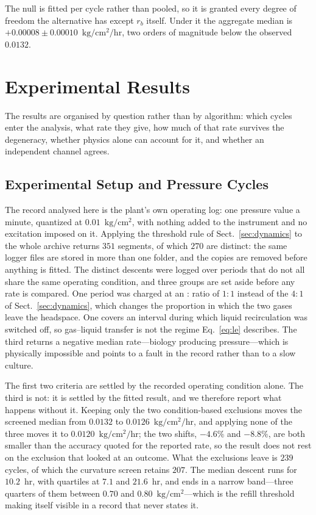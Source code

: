 \documentclass[runningheads]{llncs}
\newcommand{\pu}{\ensuremath{\mathrm{kg/cm^{2}}}}
\newcommand{\ratu}{\ensuremath{\mathrm{kg/cm^{2}/hr}}}
\newcommand{\rb}{\ensuremath{r_{b}}}
\begin{document}
The null is fitted per cycle rather than pooled, so it is granted every
degree of freedom the alternative has except $\rb$ itself. Under it the
aggregate median is
$+0.00008 \pm 0.00010$~\ratu{}, two orders of magnitude below the
observed $0.0132$.

\section{Experimental Results}
\label{sec:results}

The results are organised by question rather than by algorithm: which
cycles enter the analysis, what rate they give, how much of that rate
survives the degeneracy, whether physics alone can account for it, and
whether an independent channel agrees.

\subsection{Experimental Setup and Pressure Cycles}
\label{sec:setup}

The record analysed here is the plant's own operating log: one pressure
value a minute, quantized at $0.01$~\pu{}, with nothing added to the
instrument and no excitation imposed on it. Applying the threshold rule
of Sect.~\ref{sec:dynamics} to the whole archive returns $351$ segments, of which $270$ are
distinct: the same logger files are stored in more than one folder,
and the copies are removed before anything is fitted. The distinct
descents were logged over periods that do not all share the same operating
condition, and three groups are set aside before any rate is compared.
One period was charged at an : ratio of $1{:}1$ instead
of the $4{:}1$ of Sect.~\ref{sec:dynamics}, which changes the
proportion in which the two gases leave the headspace. One covers an
interval during which liquid recirculation was switched off, so
gas--liquid transfer is not the regime Eq.~\eqref{eq:le} describes.
The third returns a negative median rate---biology producing
pressure---which is physically impossible and points to a fault in the
record rather than to a slow culture.

The first two criteria are settled by the recorded operating condition
alone. The third is not: it is settled by the fitted result, and we
therefore report what happens without it. Keeping only the two
condition-based exclusions moves the screened median from $0.0132$ to
$0.0126$~\ratu{}, and applying none of the three moves it to
$0.0120$~\ratu{}; the two shifts, $-4.6\%$ and $-8.8\%$, are both
smaller than the accuracy quoted for the reported rate, so the result
does not rest on the exclusion that looked at an outcome. What the
exclusions leave is $239$ cycles, of which the curvature screen retains
$207$. The median descent runs for $10.2$~hr, with quartiles at $7.1$
and $21.6$~hr, and ends in a narrow band---three quarters of them
between $0.70$ and $0.80$~\pu{}---which is the refill threshold making
itself visible in a record that never states it.
\end{document}
